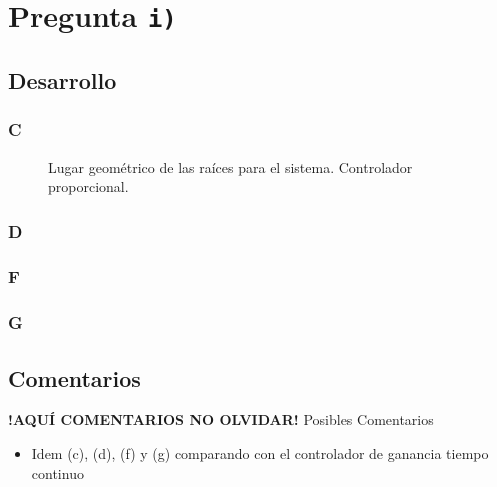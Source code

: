 \section{Pregunta \texttt{i)}}\label{pregunta-i}
\subsection{Desarrollo}

\subsubsection{C} %

\begin{figure}[ht]
  \centering
  
  \caption{Lugar geométrico de las raíces para el sistema. Controlador proporcional.}
  \label{fig:lgr-i}
\end{figure}

\FloatBarrier
\subsubsection{D}%


\FloatBarrier
\subsubsection{F}%

\FloatBarrier
\subsubsection{G}%

\FloatBarrier
\subsection{Comentarios}


\textbf{!AQUÍ COMENTARIOS NO OLVIDAR!}
Posibles Comentarios
\begin{itemize}
    \item Idem (c), (d), (f) y (g) comparando con el controlador de ganancia tiempo continuo
\end{itemize}
